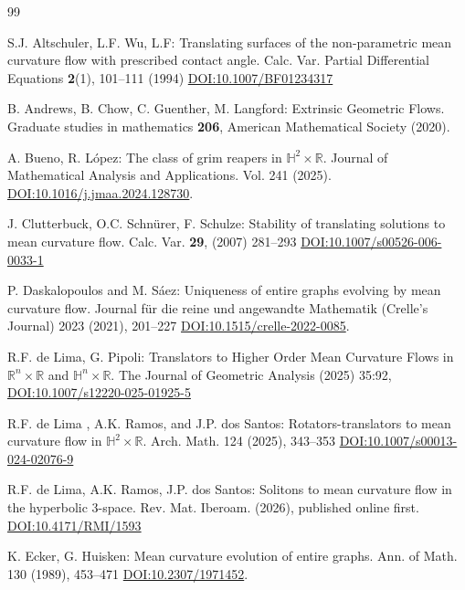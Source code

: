 \documentclass{amsart}[12pt]
\newcommand{\DOI}[1]{\href{https://doi.org/#1}{DOI:#1}}
\theoremstyle{definition}
\theoremstyle{plain}
\newcommand{\vt}{\vspace{.1cm}}
\newcommand{\R}{\mathbb{R} }
\newcommand{\h}{\mathbb{H} }
\begin{document}
\begin{thebibliography}{99}

 S.J. Altschuler, L.F. Wu, L.F:
Translating surfaces of the non-parametric mean curvature flow with
prescribed contact angle. Calc. Var.
Partial Differential Equations {\bf 2}(1), 101–111 (1994)
\DOI{10.1007/BF01234317}

\vt


 B. Andrews, B. Chow, C. Guenther, M. Langford: Extrinsic Geometric Flows.
Graduate studies in mathematics {\bf 206}, American Mathematical Society (2020).

\vt

 A. Bueno, R. López: The class of grim reapers in $\h^2\times\R$.
Journal of Mathematical Analysis and Applications. Vol. 241 (2025).
\DOI{10.1016/j.jmaa.2024.128730}.



\vt

 J. Clutterbuck, O.C. Schnürer, F. Schulze: Stability of translating solutions
to mean curvature flow. Calc. Var. {\bf 29}, (2007) 281--293
\DOI{10.1007/s00526-006-0033-1}
\vt

 P. Daskalopoulos and M. Sáez: Uniqueness of entire graphs evolving
by mean curvature flow.  Journal für die reine und angewandte Mathematik
(Crelle's Journal) 2023 (2021),  201--227
\DOI{10.1515/crelle-2022-0085}.
\vt

 R.F. de Lima, G. Pipoli: Translators to Higher Order Mean Curvature Flows in
$\R^n\times\R$ and $\h^n\times\R$.
The Journal of Geometric Analysis (2025) 35:92,
\DOI{10.1007/s12220-025-01925-5}

\vt

 R.F. de Lima , A.K. Ramos, and J.P. dos Santos:
Rotators-translators to mean curvature flow in $\h^2\times\R$.
Arch. Math. 124 (2025), 343--353
\DOI{10.1007/s00013-024-02076-9}



\vt

 R.F. de Lima, A.K. Ramos, J.P. dos Santos:
Solitons to mean curvature flow in the hyperbolic 3-space. Rev. Mat. Iberoam. (2026), published online first.
\DOI{10.4171/RMI/1593}

\vt

 K. Ecker, G. Huisken: Mean curvature evolution of entire
graphs.  Ann. of Math. 130 (1989), 453--471 
\DOI{10.2307/1971452}.


\vt


\end{thebibliography}
\end{document}
